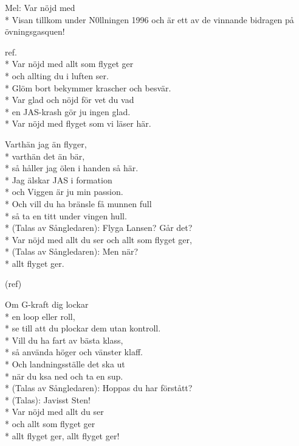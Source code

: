\begin{SongText}[Stigfinarvisan]
    \begin{SongInfo}
        Mel: Var nöjd med\\*%
        Visan tillkom under N0llningen 1996 och är ett av de vinnande bidragen på övningsgasquen!
    \end{SongInfo}
    \begin{SongVerse}
        ref.\\*%
        Var nöjd med allt som flyget ger\\*%
        och allting du i luften ser.\\*%
        Glöm bort bekymmer krascher och besvär.\\*%
        Var glad och nöjd för vet du vad\\*%
        en JAS-krash gör ju ingen glad.\\*%
        Var nöjd med flyget som vi läser här.
    \end{SongVerse}
    \begin{SongVerse}
        Varthän jag än flyger,\\*%
        varthän det än bär,\\*%
        så håller jag ölen i handen så här.\\*%
        Jag älskar JAS i formation\\*%
        och Viggen är ju min passion.\\*%
        Och vill du ha bränsle få munnen full\\*%
        så ta en titt under vingen hull.\\*%
        (Talas av Sångledaren): Flyga Lansen? Går det?\\*%
        Var nöjd med allt du ser och allt som flyget ger,\\*%
        (Talas av Sångledaren): Men när?\\*%
        allt flyget ger.
    \end{SongVerse}
    \begin{SongVerse}
        (ref)
    \end{SongVerse}
    \begin{SongVerse}
        Om G-kraft dig lockar\\*%
        en loop eller roll,\\*%
        se till att du plockar dem utan kontroll.\\*%
        Vill du ha fart av bästa klass,\\*%
        så använda höger och vänster klaff.\\*%
        Och landningsställe det ska ut\\*%
        när du ksa ned och ta en sup.\\*%
        (Talas av Sångledaren): Hoppas du har förstått?\\*%
        (Talas): Javisst Sten!\\*%
        Var nöjd med allt du ser\\*%
        och allt som flyget ger\\*%
        allt flyget ger, allt flyget ger!
    \end{SongVerse}
\end{SongText}
